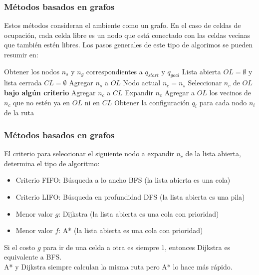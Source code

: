 \begin{frame}\frametitle{Métodos basados en grafos}
  Estos métodos consideran el ambiente como un grafo. En el caso de celdas de ocupación, cada celda libre es un nodo que está conectado con las celdas vecinas que también estén libres. Los pasos generales de este tipo de algorimos se pueden resumir en:
  \[\]
  \begin{algorithm}[H]
    \footnotesize
    \DontPrintSemicolon
    Obtener los nodos $n_s$ y $n_g$ correspondientes a $q_{start}$ y $q_{goal}$\;
    Lista abierta $OL = \emptyset$ y lista cerrada $CL = \emptyset$\;
    Agregar $n_s$ a $OL$\;
    Nodo actual $n_c = n_s$\;
    {
      Seleccionar $n_c$ de $OL$ \textbf{bajo algún criterio}\;
      Agregar $n_c$ a $CL$\;
      Expandir $n_c$\;
      Agregar a $OL$ los vecinos de $n_c$ que no estén ya en $OL$ ni en $CL$\;
    }
    Obtener la configuración $q_i$ para cada nodo $n_i$ de la ruta\;
  \end{algorithm}
\end{frame}

\begin{frame}\frametitle{Métodos basados en grafos}
  El criterio para seleccionar el siguiente nodo a expandir $n_c$ de la lista abierta, determina el tipo de algoritmo:
  \begin{itemize}
  \item Criterio FIFO: Búsqueda a lo ancho BFS (la lista abierta es una cola)
  \item Criterio LIFO:  Búsqueda en profundidad DFS (la lista abierta es una pila)
  \item Menor valor $g$: Dijkstra (la lista abierta es una cola con prioridad)
  \item Menor valor $f$: A* (la lista abierta es una cola con prioridad)
  \end{itemize}
  Si el costo $g$ para ir de una celda a otra es siempre 1, entonces Dijkstra es equivalente a BFS. \\
  A* y Dijkstra siempre calculan la misma ruta pero A* lo hace más rápido. 
\end{frame}

